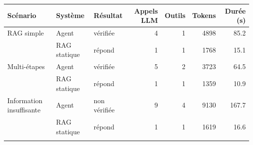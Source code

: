 \begin{tabular}{@{}l l l r r r r@{}}
\toprule
Scénario & Système & Résultat & Appels LLM & Outils & Tokens & Durée (s) \\ \midrule
RAG simple & Agent & vérifiée & 4 & 1 & 4898 & 85.2 \\
 & RAG statique & répond & 1 & 1 & 1768 & 15.1 \\
\addlinespace
Multi-étapes & Agent & vérifiée & 5 & 2 & 3723 & 64.5 \\
 & RAG statique & répond & 1 & 1 & 1359 & 10.9 \\
\addlinespace
Information insuffisante & Agent & non vérifiée & 9 & 4 & 9130 & 167.7 \\
 & RAG statique & répond & 1 & 1 & 1619 & 16.6 \\
\addlinespace
\bottomrule
\end{tabular}
